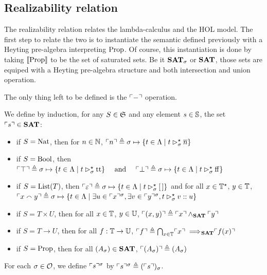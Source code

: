 \documentclass[a4paper,UKenglish,cleveref, autoref, thm-restate]{lipics-v2021}
\begin{document}
\subsection{Realizability relation}
\label{}


The realizability relation relates the lambda-calculus and the HOL model. The first step to relate the two is to instantiate the semantic defined previously with a Heyting pre-algebra interpreting $\mathrm{Prop}$. Of course, this instantiation is done by taking $\llbracket \mathrm{Prop} \rrbracket$ to be the set of saturated sets. Be it ${\mathbf{SAT}}_{\sigma}$ or ${\mathbf{SAT}}$, those sets are equiped with a Heyting pre-algebra structure and both intersection and union operation.

The only thing left to be defined is the $\ulcorner-\urcorner$ operation.

\begin{definition}
  We define by induction, for any $S \in \mathfrak S$ and any element $s \in \mathbb S$, the set $\ulcorner s\urcorner \in {\mathbf{SAT}}$:
  \begin{itemize}
  \item if $S = \mathrm{Nat}$, then for $n \in \mathbb N$,
    $\ulcorner n\urcorner \triangleq \sigma \mapsto \{ t \in \Lambda \mid t \rhd^{\star}_{\sigma} \overline n\}$
  \item if $S = \mathrm{Bool}$, then
    $\ulcorner\top\urcorner \triangleq \sigma \mapsto \{ t \in \Lambda \mid t \rhd^{\star}_{\sigma} \mathrm{tt}\}\quad\text{ and }\quad\ulcorner\bot\urcorner \triangleq \sigma\mapsto \{ t \in \Lambda \mid t \rhd^{\star}_{\sigma} \mathrm{ff}\}$
  \item if $S = \mathrm{List}(T)$, then
    $\ulcorner\varepsilon\urcorner \triangleq \sigma \mapsto\{ t \in \Lambda \mid t \rhd^{\star}_{\sigma} [\,] \}$
    and for all $x \in \mathbb T^\star$, $y \in \mathbb T$,
    \mbox{$\ulcorner x \smallfrown y\urcorner \triangleq \sigma\mapsto \{ t \in \Lambda \mid \exists u \in \ulcorner x\urcorner^{\sigma}, \exists v \in \ulcorner y\urcorner^{\sigma}, t \rhd^{\star}_{\sigma} v :: u\}$}
  \item if $S = T \times U$, then for all $x \in \mathbb T$, $y \in \mathbb U$,
    $\ulcorner(x,y)\urcorner \triangleq \ulcorner x\urcorner \land_{{\mathbf{SAT}}} \ulcorner y\urcorner$
  \item if $S = T \to U$, then for all $f : \mathbb T \to \mathbb U$,
    $\ulcorner f\urcorner \triangleq \bigcap_{x \in \mathbb T} \ulcorner x\urcorner \implies\!\!\!_{{\mathbf{SAT}}} \ulcorner f(x)\urcorner$
  \item if $S = \mathrm{Prop}$, then for all $(A_\sigma) \in {\mathbf{SAT}}$,
    $\ulcorner(A_\sigma)\urcorner \triangleq (A_\sigma)$
  \end{itemize}
  For each $\sigma\in\mathcal O$, we define $\ulcorner s\urcorner^{\sigma}$ by $\ulcorner s\urcorner^{\sigma} \triangleq (\ulcorner s\urcorner)_\sigma$.
\end{definition}
\end{document}
